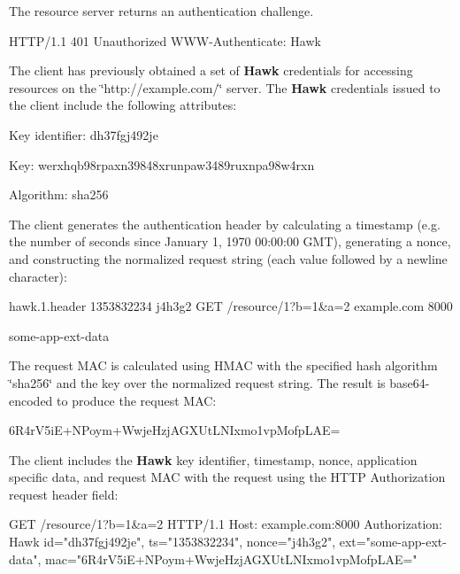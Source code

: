 The resource server returns an authentication challenge.


\begin{DoxyCode}
HTTP/1.1 401 Unauthorized
WWW-Authenticate: Hawk
\end{DoxyCode}


The client has previously obtained a set of {\bfseries Hawk} credentials for accessing resources on the \char`\"{}http\+://example.\+com/\char`\"{} server. The {\bfseries Hawk} credentials issued to the client include the following attributes\+:


\begin{DoxyItemize}
\item Key identifier\+: dh37fgj492je
\item Key\+: werxhqb98rpaxn39848xrunpaw3489ruxnpa98w4rxn
\item Algorithm\+: sha256
\end{DoxyItemize}

The client generates the authentication header by calculating a timestamp (e.\+g. the number of seconds since January 1, 1970 00\+:00\+:00 G\+MT), generating a nonce, and constructing the normalized request string (each value followed by a newline character)\+:


\begin{DoxyCode}
hawk.1.header
1353832234
j4h3g2
GET
/resource/1?b=1&a=2
example.com
8000

some-app-ext-data
\end{DoxyCode}


The request M\+AC is calculated using H\+M\+AC with the specified hash algorithm \char`\"{}sha256\char`\"{} and the key over the normalized request string. The result is base64-\/encoded to produce the request M\+AC\+:


\begin{DoxyCode}
6R4rV5iE+NPoym+WwjeHzjAGXUtLNIxmo1vpMofpLAE=
\end{DoxyCode}


The client includes the {\bfseries Hawk} key identifier, timestamp, nonce, application specific data, and request M\+AC with the request using the H\+T\+TP {\ttfamily Authorization} request header field\+:


\begin{DoxyCode}
GET /resource/1?b=1&a=2 HTTP/1.1
Host: example.com:8000
Authorization: Hawk id="dh37fgj492je", ts="1353832234", nonce="j4h3g2", ext="some-app-ext-data",
       mac="6R4rV5iE+NPoym+WwjeHzjAGXUtLNIxmo1vpMofpLAE="
\end{DoxyCode}


